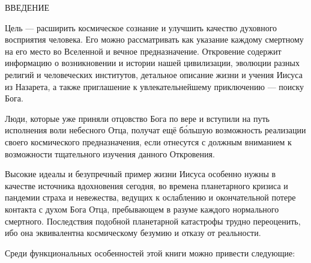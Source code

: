 \newpage
\thispagestyle{empty}
\fancyhead[C]{}

\makeatletter
{}%
\makeatother

\begin{center}
\bibpapertitlefont
ВВЕДЕНИЕ
\end{center}

\bibbookend

Цель  --- расширить космическое сознание
и улучшить качество духовного восприятия человека.
Его можно рассматривать как указание каждому смертному на его место во Вселенной и вечное предназначение.
Откровение содержит информацию о возникновении и истории нашей цивилизации, эволюции разных религий
и человеческих институтов, детальное описание жизни и учения Иисуса из Назарета,
а также приглашение к увлекательнейшему приключению --- поиску Бога.

Люди, которые уже приняли отцовство Бога по вере и вступили на путь исполнения воли небесного Отца, получат
ещё б\'ольшую возможность реализации своего космического предназначения, если отнесутся с должным вниманием
к возможности тщательного изучения данного Откровения.

Высокие идеалы и безупречный пример жизни Иисуса особенно нужны в качестве источника вдохновения сегодня,
во времена планетарного кризиса и пандемии страха и невежества,
ведущих к ослаблению и окончательной потере контакта с духом Бога Отца, пребывающем в разуме каждого нормального смертного.
Последствия подобной планетарной катастрофы трудно переоценить, ибо она эквивалентна космическому безумию и отказу от
реальности.

Среди функциональных особенностей этой книги можно привести следующие:

